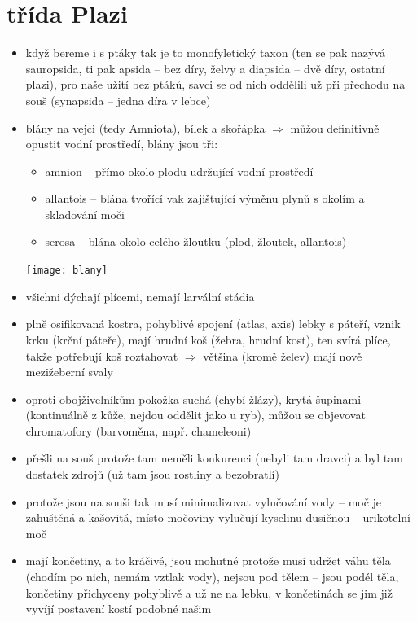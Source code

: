 \documentclass{article}
\begin{document}
\section{třída Plazi}
\begin{itemize}
  \item když bereme i s ptáky tak je to monofyletický taxon (ten se pak nazývá sauropsida, ti pak apsida -- bez díry, želvy a diapsida -- dvě díry, ostatní plazi), pro naše užití bez ptáků, savci se od nich oddělili už při přechodu na souš (synapsida -- jedna díra v lebce)
  \item blány na vejci (tedy Amniota), bílek a skořápka $\Rightarrow$ můžou definitivně opustit vodní prostředí, blány jsou tři:
  \begin{minipage}{0.8\textwidth}
    \begin{itemize}
      \item amnion -- přímo okolo plodu udržující vodní prostředí
      \item allantois -- blána tvořící vak zajišťující výměnu plynů s okolím a skladování moči
      \item serosa -- blána okolo celého žloutku (plod, žloutek, allantois)
    \end{itemize}
  \end{minipage}
  \hfill
  \noindent\begin{minipage}{0.2\textwidth}
      \texttt{[image: blany]}
  \end{minipage}
  \item všichni dýchají plícemi, nemají larvální stádia
  \item plně osifikovaná kostra, pohyblivé spojení (atlas, axis) lebky s páteří, vznik krku (krční páteře), mají hrudní koš (žebra, hrudní kost), ten svírá plíce, takže potřebují koš roztahovat $\Rightarrow$ většina (kromě želev) mají nově mezižeberní svaly
  \item oproti obojživelníkům pokožka suchá (chybí žlázy), krytá šupinami (kontinuálně z kůže, nejdou oddělit jako u ryb), můžou se objevovat chromatofory (barvoměna, např. chameleoni)
  \item přešli na souš protože tam neměli konkurenci (nebyli tam dravci) a byl tam dostatek zdrojů (už tam jsou rostliny a bezobratlí)
  \item protože jsou na souši tak musí minimalizovat vylučování vody -- moč je zahuštěná a kašovitá, místo močoviny vylučují kyselinu dusičnou -- urikotelní moč
  \item mají končetiny, a to kráčivé, jsou mohutné protože musí udržet váhu těla (chodím po nich, nemám vztlak vody), nejsou pod tělem -- jsou podél těla, končetiny přichyceny pohyblivě a už ne na lebku, v končetinách se jim již vyvíjí postavení kostí podobné našim

\end{itemize}
\end{document}
